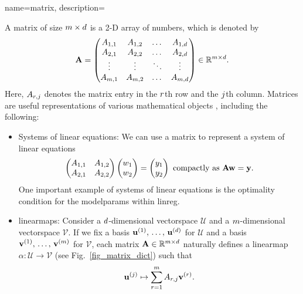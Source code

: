 {name={matrix},
	description={A matrix of size $m \times d$ is a 2-D array of numbers, 
 		which is denoted by 
		$$
  		{\bf A} = \begin{pmatrix}
   		A_{1,1} & A_{1,2} & \dots  & A_{1,d} \\
		A_{2,1} & A_{2,2} & \dots  & A_{2,d} \\
		\vdots  & \vdots  & \ddots & \vdots \\
		A_{m,1} & A_{m,2} & \dots  & A_{m,d}
		\end{pmatrix} \in \mathbb{R}^{m \times d}.
		$$
		Here, $A_{r,j}$ denotes the matrix entry in the $r$th row and the 
		$j$th column. Matrices are useful representations of various mathematical objects \cite{StrangLinAlg2016},
		including the following:
		\begin{itemize}
			\item Systems of linear equations: We can use a matrix to represent a system of linear equations 
			$$ \begin{pmatrix}
			A_{1,1} & A_{1,2} \\
			A_{2,1} & A_{2,2}
			\end{pmatrix}
			\begin{pmatrix}
				w_1 \\
				w_2
			\end{pmatrix}
			=\begin{pmatrix}
				y_1 \\
				y_2
			\end{pmatrix}
			\text{ compactly as } {\bf A} {\bf w} = {\bf y}.
			$$
    			One important example of systems of linear equations is the optimality condition for the 
    			\glspl{modelparam} within \gls{linreg}. 
			\item \Glspl{linearmap}:
			Consider a $d$-dimensional \gls{vectorspace} $\mathcal{U}$ and a $m$-dimensional \gls{vectorspace} $\mathcal{V}$. 
			If we fix a \gls{basis} $\mathbf{u}^{(1)},\,\ldots,\,\mathbf{u}^{(d)}$ for $\mathcal{U}$ and a \gls{basis} $\mathbf{v}^{(1)},\,\ldots,\,\mathbf{v}^{(m)}$ 
			for $\mathcal{V}$, each matrix ${\bf A} \in \mathbb{R}^{m \times d}$ naturally defines a 
			\gls{linearmap} $\alpha: \mathcal{U} \rightarrow \mathcal{V}$ (see Fig.\ \ref{fig_matrix_dict}) such that
   			$${\bf u}^{(j)} \mapsto \sum_{r=1}^{m} A_{r,j} {\bf v}^{(r)}.$$

\end{itemize}}}
